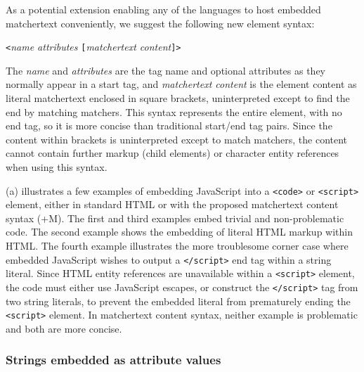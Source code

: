 As a potential extension enabling any of the \ml languages
to host embedded matchertext conveniently,
we suggest the following new element syntax:

\begin{center}
\verb|<|\emph{name attributes }\verb|[|\emph{matchertext content}\verb|]>|
\end{center}

The \emph{name} and \emph{attributes} are the tag name and optional attributes
as they normally appear in a start tag,
and \emph{matchertext content} is the element content as literal matchertext
enclosed in square brackets,
uninterpreted except to find the end by matching matchers.
This syntax represents the entire element,
with no end tag,
so it is more concise than traditional start/end tag pairs.
Since the content within brackets is uninterpreted except to match matchers,
the content cannot contain further markup (child elements)
or \ml character entity references when using this syntax.

(a) illustrates a few examples
of embedding JavaScript into a \verb|<code>| or \verb|<script>| element,
either in standard HTML or with the proposed matchertext content syntax (+M).
The first and third examples embed trivial and non-problematic code.
The second example shows the embedding of literal HTML markup within HTML.
The fourth example illustrates the more troublesome corner case
where embedded JavaScript wishes to output
a \verb|</script>| end tag within a string literal.
Since HTML entity references are unavailable within a \verb|<script>| element,
the code must either use JavaScript escapes,
or construct the \verb|</script>| tag from two string literals,
to prevent the embedded literal from prematurely ending
the \verb|<script>| element.
In matchertext content syntax,
neither example is problematic and both are more concise.


\subsubsection{Strings embedded as attribute values}
\label{sec:host:ml:attr}

